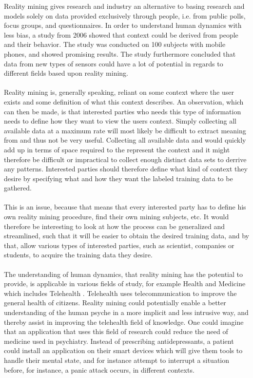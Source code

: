 Reality mining gives research and industry an alternative to basing research and models solely on data provided exclusively through people, i.e. from public polls, focus groups, and questionnaires. In order to understand human dynamics with less bias, a study from 2006 \parencite{eagle2006_reality_mining_definition} showed that context could be derived from people and their behavior. The study was conducted on 100 subjects with mobile phones, and showed promising results. The study furthermore concluded that data from new types of sensors could have a lot of potential in regards to different fields based upon reality mining. 
\\\\
Reality mining is, generally speaking, reliant on some context where the user exists and some definition of what this context describes. An observation, which can then be made, is that interested parties who needs this type of information needs to define how they want to view the users context. Simply collecting all available data at a maximum rate will most likely be difficult to extract meaning from and thus not be very useful. Collecting all available data and would quickly add up in terms of space required to the represent the context and it might therefore be difficult or impractical to collect enough distinct data sets to derrive any patterns. Interested parties should therefore define what kind of context they desire by specifying what and how they want the labeled training data to be gathered. 
\\\\
This is an issue, because that means that every interested party has to define his own reality mining procedure, find their own mining subjects, etc. It would therefore be interesting to look at how the process can be generalized and streamlined, such that it will be easier to obtain the desired training data, and by that, allow various types of interested parties, such as scientist, companies or students, to acquire the training data they desire.
\\\\
The understanding of human dynamics, that reality mining has the potential to provide, is applicable in various fields of study, for example Health and Medicine \parencite{pentland2009_reality_mining_health_medicine} which includes Telehealth \parencite{telehealth_aau}. Telehealth uses telecommunication to improve the general health of citizens. Reality mining could potentially enable a better understanding of the human psyche in a more implicit and less intrusive way, and thereby assist in improving the telehealth field of knowledge. One could imagine that an application that uses this field of research could reduce the need of medicine used in psychiatry. Instead of prescribing antidepressants, a patient could install an application on their smart devices which will give them tools to handle their mental state, and for instance attempt to interrupt a situation before, for instance, a panic attack occurs, in different contexts. 
